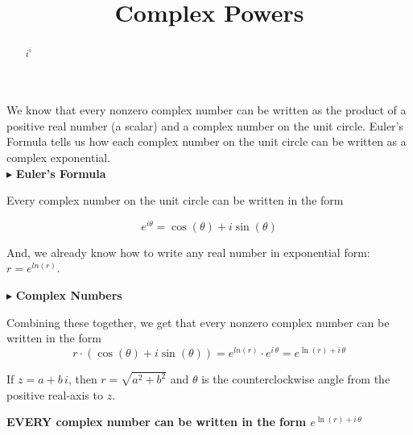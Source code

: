 \documentclass{ximera}
\title{Complex Powers}
\begin{document}
\begin{abstract}
$i^i$
\end{abstract}
\maketitle





We know that every nonzero complex number can be written as the product of a positive real number (a scalar) and a complex number on the unit circle.  Euler's Formula tells us how each complex number on the unit circle can be written as a complex exponential. \\




$\blacktriangleright$ \textbf{\textcolor{purple!85!blue}{Euler's Formula}}   


Every complex number on the unit circle can be written in the form


\[   e^{i \theta} = \cos(\theta) + i \sin(\theta)         \]


And, we already know how to write any real number in exponential form: $r = e^{ln(r)}$.  





$\blacktriangleright$ \textbf{\textcolor{purple!85!blue}{Complex Numbers}}   




Combining these together, we get that every nonzero complex number can be written in the form  
\[
r \cdot (\cos(\theta) + i \sin(\theta))  = e^{ln(r)} \cdot e^{i \, \theta} = e^{\ln(r) + i \, \theta}
\]



If $z = a + b \, i$, then $r = \sqrt{a^2 + b^2}$ and $\theta$ is the counterclockwise angle from the positive real-axis to $z$.




\begin{center}

\textbf{\textcolor{red!80!black}{EVERY complex number can be written in the form $e^{\ln(r) + i \, \theta}$}}

\end{center}
\end{document}
